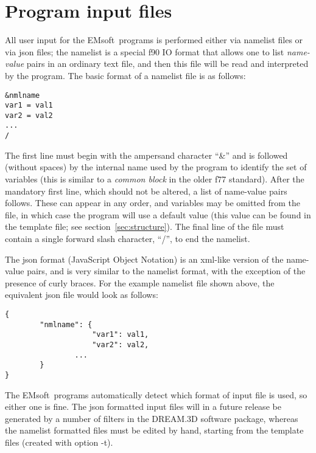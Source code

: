 \documentclass[DIV=calc, paper=letter, fontsize=11pt]{scrartcl}	 %
\newcommand{\ctp}{\textsf{EMsoft}}
\begin{document}
\newpage
\section{Program input files\label{sec:f90input}}
All user input for the \ctp\ programs is performed either via namelist files or via json files; the namelist is a special f90 IO format that allows one to list 
\textit{name-value} pairs in an ordinary text file, and then this file will be read and interpreted by the 
program.  The basic format of a namelist file is as follows:
\begin{verbatim}
&nmlname
var1 = val1
var2 = val2
...
/
\end{verbatim}
The first line must begin with the ampersand character ``\&'' and is followed (without spaces) by the internal name used by the program 
to identify the set of variables (this is similar to a \textit{common block} in the older f77 standard).  After the mandatory first line, which should not be altered, a 
list of name-value pairs follows.  These can appear in any order, and variables may be omitted from the file, in which case the program
will use a default value (this value can be found in the template file; see section~\ref{sec:structure}).  The final line of the file must contain a single forward slash
character, ``/'', to end the namelist.

The json format (JavaScript Object Notation) is an xml-like version of the name-value pairs, and is very similar to the namelist format, with the exception 
of the presence of curly braces.  For the example namelist file shown above, the equivalent json file would look as follows:
\begin{verbatim}
{
        "nmlname": {
        	        "var1": val1,
        	        "var2": val2,
                ...		
        }
}
\end{verbatim}
The \ctp\ programs automatically detect which format of input file is used, so either one is fine.  The json formatted input files 
will in a future release be generated by a number of filters in the \textsf{DREAM.3D} software package, whereas the namelist formatted 
files must be edited by hand, starting from the template files (created with option -t).\\
\end{document}
